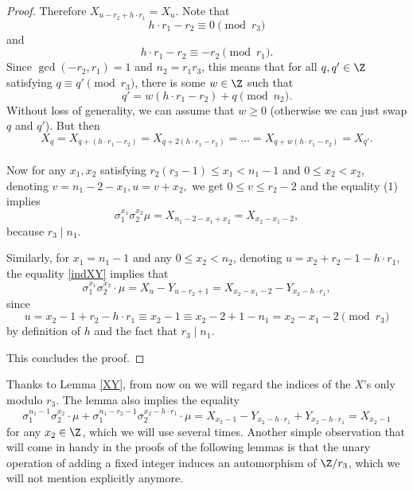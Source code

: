 \begin{proof}
Therefore $X_{u -r_2+h\cdot r_1}=X_u$. Note that $$h\cdot r_1-r_2\equiv 0 \pmod{r_3}$$ and $$h\cdot r_1-r_2\equiv -r_2\pmod{r_1}.$$ Since $\gcd(-r_2,r_1)=1$ and $n_2=r_1r_3$, this means that for all $q,q'\in\Z$ satisfying $q\equiv q'\pmod{r_3}$, there is some $w\in\Z$ such that $$q'=w(h\cdot r_1-r_2)+q \pmod{n_2}.$$ 
Without loss of generality, we can assume that $w\ge 0$ (otherwise we can just swap $q$ and $q'$). But then $$X_{q}=X_{q+(h\cdot r_1-r_2)}=X_{q+2(h\cdot r_1-r_2)}=\dots=X_{q+w(h\cdot r_1-r_2)}=X_{q'}.$$

\paragraph*{}
Now for any $x_1,x_2$ satisfying $r_2 (r_3-1) \le x_1 < n_1 - 1$ and $0\le x_2 <x_2$, denoting $v = n_1 - 2 - x_1,  u = v + x_2,$
we get  $0 \le v \le r_2 - 2$ and the equality (1) implies
$$\sigma_1 ^{x_1} \sigma_2 ^{x_2} \mu = X_{n_1-2-x_1+x_2} 
= X_{x_2-x_1-2},$$
because $r_3 \mid n_1$.

Similarly, for $x_1=n_1-1$ and any $0 \le x_2 <n_2$, denoting $u=x_2+r_2-1-h\cdot r_1$, the equality \eqref{indXY} implies that 
$$\sigma_1^{x_1}\sigma_2^{x_2}\cdot \mu=X_u-Y_{u-r_2+1}=X_{x_2-x_1-2}-Y_{x_2-h\cdot r_1},$$ since 
$$u = x_2-1+r_2-h\cdot r_1 \equiv x_2-1\equiv x_2-2+1-n_1=x_2-x_1-2 \pmod{r_3}$$
by definition of $h$ and the fact that $r_3 \mid n_1$.

This concludes the proof.
\end{proof}

Thanks to Lemma \ref{XY}, from now on we will regard the indices of the $X$'s only modulo $r_3$. %
The lemma also implies the equality
\begin{equation}\label{Ycancel}
\sigma_1^{n_1-1}\sigma_2^{x_2}\cdot \mu+\sigma_1^{n_1-r_2-1}\sigma_2^{x_2-h\cdot r_1}\cdot \mu=X_{x_2-1}-Y_{x_2-h\cdot r_1}+Y_{x_2-h\cdot r_1}= X_{x_2-1}
\end{equation}
for any $x_2\in\Z$, which we will use several times. Another simple observation that will come in handy in the proofs of the following lemmas is that the unary operation of adding a fixed integer induces an automorphism of $\Z/r_3$, which we will not mention explicitly anymore.

